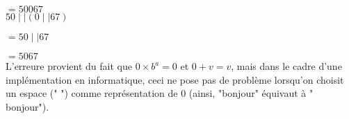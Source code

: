 \documentclass[a4paper, 12pt]{article}
\begin{document}
\hspace{\parindent} $= 50067$ \\

\hspace{\parindent} $50 \mid\mid \left( 0 \mid\mid 67 \right)$

\hspace{\parindent} $= 50 \mid\mid 67$

\hspace{\parindent} $= 5067$ \\

L'erreure provient du fait que $0 \times b^{a} = 0$ et $0 + v = v$, mais dans le cadre
d'une implémentation en informatique, ceci ne pose pas de problème lorsqu'on choisit
un espace (" ") comme représentation de 0 (ainsi, "bonjour" équivaut à "    bonjour").
\end{document}
